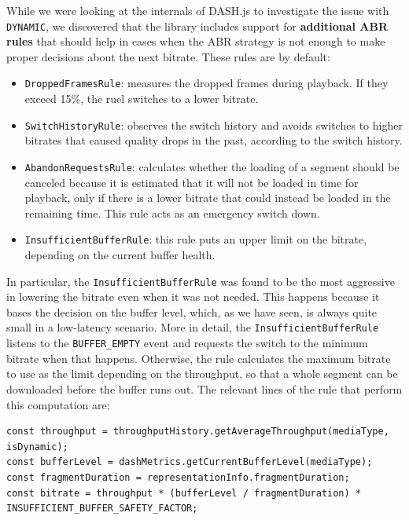 While we were looking at the internals of DASH.js to investigate the issue with \texttt{DYNAMIC}, we discovered that the library includes support for \textbf{additional ABR rules} that should help in cases when the ABR strategy is not enough to make proper decisions about the next bitrate. These rules are by default:

\begin{itemize}
    \item \texttt{DroppedFramesRule}: measures the dropped frames during playback. If they exceed 15\%, the ruel switches to a lower bitrate.
    \item \texttt{SwitchHistoryRule}: observes the switch history and avoids switches to higher bitrates that caused quality drops in the past, according to the switch history.
    \item \texttt{AbandonRequestsRule}: calculates whether the loading of a segment should be canceled because it is estimated that it will not be loaded in time for playback, only if there is a lower bitrate that could instead be loaded in the remaining time. This rule acts as an emergency switch down.
    \item \texttt{InsufficientBufferRule}: this rule puts an upper limit on the bitrate, depending on the current buffer health.
\end{itemize}

In particular, the \texttt{InsufficientBufferRule} was found to be the most aggressive in lowering the bitrate even when it was not needed. This happens because it bases the decision on the buffer level, which, as we have seen, is always quite small in a low-latency scenario. More in detail, the \texttt{InsufficientBufferRule} listens to the \texttt{BUFFER\_EMPTY} event and requests the switch to the minimum bitrate when that happens. Otherwise, the rule calculates the maximum bitrate to use as the limit depending on the throughput, so that a whole segment can be downloaded before the buffer runs out. The relevant lines of the rule that perform this computation are:

\begin{verbatim}
const throughput = throughputHistory.getAverageThroughput(mediaType, isDynamic);
const bufferLevel = dashMetrics.getCurrentBufferLevel(mediaType);
const fragmentDuration = representationInfo.fragmentDuration;
const bitrate = throughput * (bufferLevel / fragmentDuration) * INSUFFICIENT_BUFFER_SAFETY_FACTOR;
\end{verbatim}

